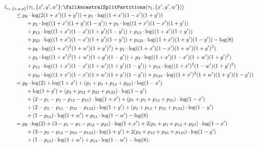 \begin{align*}
&    \ell_{\tau_1,\{x,y,y\}}(\tau_1, \{x',y',w'\}; \fullAncestralSplitPartitions(\tau_1,\{x',y',w'\})) \\
&\qquad \le      p_{\emptyset}  \cdot\log(2(1+x')(1+y'))
+ p_{1}          \cdot\log((1+x')(1-x')(1+y')) \\
    &\qquad\qquad + p_{2}          \cdot\log((1+x')(1+y')(1-y'))
+ p_{3}          \cdot\log((1+x')(1-x')(1+y')) \\
    &\qquad\qquad + p_{12}         \cdot\log((1+x')(1-x')(1+y')(1-y'))
+ p_{13}         \cdot\log((1+x')(1+y')) \\
    &\qquad\qquad + p_{23}         \cdot\log((1+x')(1-x')(1+y')(1-y'))
+ p_{123}        \cdot\log((1+x')(1+y')(1-y'))
- \log(8) \\
    &\qquad\qquad + p_{\emptyset}  \cdot\log((1+x')^2   (1+w')(1+y')^2)
+ p_{1}          \cdot\log((1+x')(1-x')(1+w')(1+y')^2) \\
    &\qquad\qquad + p_{2}          \cdot\log((1+x')^2   (1+w')(1+y')(1-y'))
+ p_{3}          \cdot\log((1+x')(1-x')(1+w')(1+y')^2) \\
    &\qquad\qquad + p_{12}         \cdot\log((1+x')(1-x')(1+w')(1+y')(1-y'))
+ p_{13}         \cdot\log((1+x')^2   (1-w')(1+y')^2) \\
    &\qquad\qquad + p_{23}         \cdot\log((1+x')(1-x')(1+w')(1+y')(1-y'))
+ p_{123}        \cdot\log((1+x')^2   (1+w')(1+y')(1-y')) \\
&\qquad =      p_{\emptyset}  \cdot\log(2)
+ \log(1+x')
+ (p_{1}+p_{3}+p_{12}+p_{23})\cdot\log(1-x') \\
&\qquad\qquad + \log(1+y')
+ (p_{2}+p_{12}+p_{23}+p_{123})\cdot\log(1-y') \\
&\qquad\qquad + (2-p_{1}-p_{3}-p_{12}-p_{23})\cdot\log(1+x')
+ (p_{1}+p_{3}+p_{12}+p_{23})\cdot\log(1-x') \\
&\qquad\qquad + (2-p_{2}-p_{12}-p_{23}-p_{123})\cdot\log(1+y')
+ (p_{2}+p_{12}+p_{23}+p_{123})\cdot\log(1-y') \\
&\qquad\qquad + (1-p_{13})\cdot\log(1+w')
+ p_{13}\cdot\log(1-w')
- \log(8) \\
&\qquad =      p_{\emptyset}  \cdot\log(2)
+ (3-p_{1}-p_{3}-p_{12}-p_{23})\cdot\log(1+x')
+ 2(p_{1}+p_{3}+p_{12}+p_{23})\cdot\log(1-x') \\
&\qquad\qquad + (3-p_{2}-p_{12}-p_{23}-p_{123})\cdot\log(1+y')
+ 2(p_{2}+p_{12}+p_{23}+p_{123})\cdot\log(1-y') \\
&\qquad\qquad + (1-p_{13})\cdot\log(1+w')
+ p_{13}\cdot\log(1-w')
- \log(8).
\end{align*}
